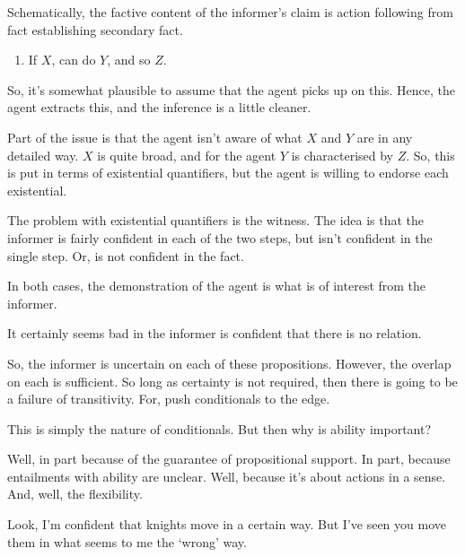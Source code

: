 \documentclass[10pt]{article}
\begin{document}
\begin{note}
  Schematically, the factive content of the informer's claim is action following from fact establishing secondary fact.
  \begin{enumerate}
  \item If \(X\), can do \(Y\), and so \(Z\).
  \end{enumerate}
  So, it's somewhat plausible to assume that the agent picks up on this.
  Hence, the agent extracts this, and the inference is a little cleaner.

  Part of the issue is that the agent isn't aware of what \(X\) and \(Y\) are in any detailed way.
  \(X\) is quite broad, and for the agent \(Y\) is characterised by \(Z\).
  So, this is put in terms of existential quantifiers, but the agent is willing to endorse each existential.

  The problem with existential quantifiers is the witness.
  The idea is that the informer is fairly confident in each of the two steps, but isn't confident in the single step.
  Or, is not confident in the fact.

  In both cases, the demonstration of the agent is what is of interest from the informer.

  It certainly seems bad in the informer is confident that there is no relation.

  So, the informer is uncertain on each of these propositions.
  However, the overlap on each is sufficient.
  So long as certainty is not required, then there is going to be a failure of transitivity.
  For, push conditionals to the edge.
\end{note}

\begin{note}[No magic]
  This is simply the nature of conditionals.
  But then why is ability important?

  Well, in part because of the guarantee of propositional support.
  In part, because entailments with ability are unclear.
  Well, because it's about actions in a sense.
  And, well, the flexibility.
\end{note}

\begin{note}
  Look, I'm confident that knights move in a certain way.
  But I've seen you move them in what seems to me the `wrong' way.
\end{note}
\end{document}
